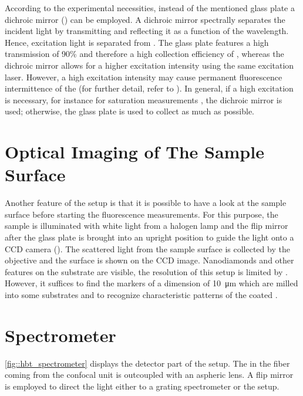 		According to the experimental necessities, instead of the mentioned glass plate a dichroic mirror () can be employed.
		A dichroic mirror spectrally separates the incident light by transmitting and reflecting it as a function of the wavelength. 
		Hence, excitation light is separated from \fl.
		The glass plate features a high transmission of 90\% and therefore a high collection efficiency of \fl, whereas the dichroic mirror allows for a higher excitation intensity using the same excitation laser. 
		However, a high excitation intensity may cause permanent fluorescence intermittence of the \sivs (for further detail, refer to ).
		In general, if a high excitation is necessary, for instance for saturation measurements , the dichroic mirror is used; otherwise, the glass plate is used to collect as much \fl as possible.

	\section[Optical Imaging]{Optical Imaging of The Sample Surface} \label{sec::methods_optical}

		Another feature of the setup is that it is possible to have a look at the sample surface before starting the fluorescence measurements.
		For this purpose, the sample is illuminated with white light from a halogen lamp and the flip mirror after the glass plate is brought into an upright position to guide the light onto a CCD camera ().
		The scattered light from the sample surface is collected by the objective and the surface is shown on the CCD image.
		Nanodiamonds and other features on the substrate are visible, the resolution of this setup is limited by .
		However, it suffices to find the markers of a dimension of \SI{10}{\micro\meter} which are milled into some substrates and to recognize characteristic patterns of the coated \nds.

	\section[Spectrometer]{Spectrometer} \label{sec::methods_spectrometer}

		\autoref{fig::hbt_spectrometer} displays the detector part of the setup.
		The \fl in the fiber coming from the confocal unit is outcoupled with an aspheric lens. 
		A flip mirror is employed to direct the light either to a grating spectrometer or the \hbt setup.

